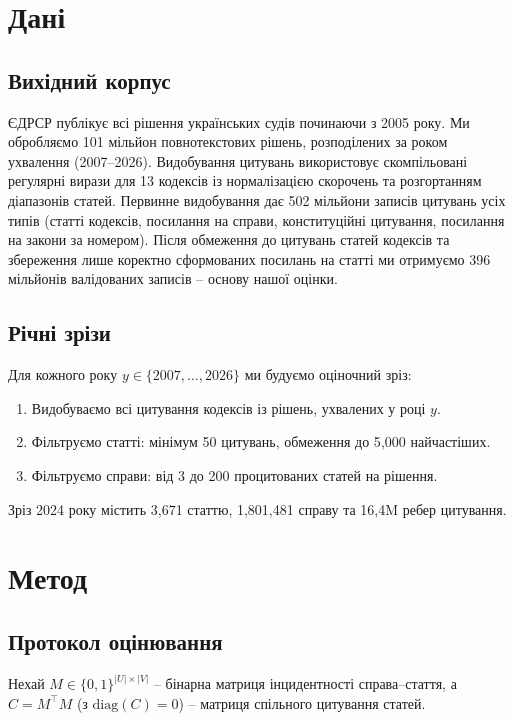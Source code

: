 \section{Дані}
\label{sec:data}

\subsection{Вихідний корпус}

ЄДРСР публікує всі рішення українських судів починаючи з 2005 року.
Ми обробляємо 101 мільйон повнотекстових рішень, розподілених за роком ухвалення (2007–2026).
Видобування цитувань використовує скомпільовані регулярні вирази для 13 кодексів із нормалізацією скорочень та розгортанням діапазонів статей.
Первинне видобування дає 502 мільйони записів цитувань усіх типів (статті кодексів, посилання на справи, конституційні цитування, посилання на закони за номером).
Після обмеження до цитувань статей кодексів та збереження лише коректно сформованих посилань на статті ми отримуємо 396 мільйонів валідованих записів – основу нашої оцінки.

\subsection{Річні зрізи}

Для кожного року $y \in \{2007, \ldots, 2026\}$ ми будуємо оціночний зріз:
\begin{enumerate}[nosep,leftmargin=*]
  \item Видобуваємо всі цитування кодексів із рішень, ухвалених у році $y$.
  \item Фільтруємо статті: мінімум 50 цитувань, обмеження до 5{,}000 найчастіших.
  \item Фільтруємо справи: від 3 до 200 процитованих статей на рішення.
\end{enumerate}
Зріз 2024 року містить 3{,}671 статтю, 1{,}801{,}481 справу та 16,4M ребер цитування.

\section{Метод}
\label{sec:method}

\subsection{Протокол оцінювання}

Нехай $M \in \{0,1\}^{|U| \times |V|}$ – бінарна матриця інцидентності справа–стаття, а $C = M^\top M$ (з $\text{diag}(C) = 0$) – матриця спільного цитування статей.


